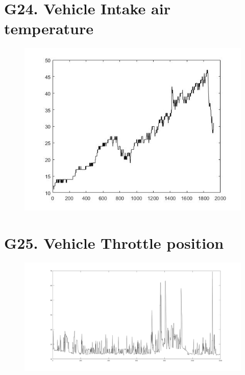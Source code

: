 \documentclass{article}
\begin{document}
\section*{G24. Vehicle Intake air temperature }
\begin{figure}[h!]
 \begin{center}
 \advance\leftskip-6cm
  \includegraphics[width=230mm,scale=0.7]{g24s1.jpg}
\end{center}
\end{figure}
\newpage
\section*{G25. Vehicle Throttle position }
\begin{figure}[h!]
 \begin{center}
 \advance\leftskip-6cm
  \includegraphics[width=230mm,scale=0.7]{g25s1.jpg}
\end{center}
\end{figure}
\newpage
\end{document}
